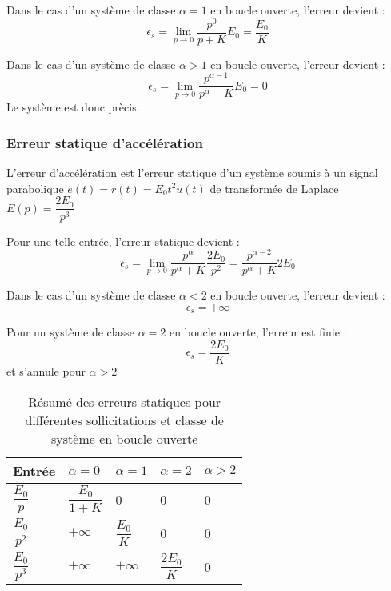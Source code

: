 Dans le cas d'un système de classe $\alpha=1$ en boucle ouverte, 
l'erreur devient :
$$
\epsilon_s=\lim\limits_{p\to 0}\dfrac{p^0}{p+K}E_0=\dfrac{E_0}{K}
$$

Dans le cas d'un système de classe $\alpha>1$ en boucle ouverte, 
l'erreur devient :
$$
\epsilon_s=\lim\limits_{p\to 0}\dfrac{p^{\alpha-1}}{p^\alpha+K}E_0=0
$$
Le système est donc prècis.

\subsubsection{Erreur statique d'accélération}

L'erreur d'accélération est l'erreur statique d'un système soumis à un signal
parabolique $e(t)=r(t)=E_0t^2 u(t)$ de transformée de Laplace 
$E(p)=\dfrac{2E_0}{p^3}$

Pour une telle entrée, l'erreur statique devient :
$$
\epsilon_s=\lim\limits_{p\to 0} \dfrac{p^\alpha}{p^\alpha+K}\dfrac{2E_0}{p^2}
          =\dfrac{p^{\alpha-2}}{p^\alpha+K}2E_0 
$$

Dans le cas d'un système de classe $\alpha<2$ en boucle ouverte, 
l'erreur devient :
$$
\epsilon_s=+\infty
$$

Pour un système de classe $\alpha=2$ en boucle ouverte, 
l'erreur est finie :
$$
\epsilon_s=\dfrac{2E_0}{K}
$$
et s'annule pour $\alpha>2$

\begin{table}
    \centering
    \begin{tabular}{@{}P{2cm}P{2cm}P{2cm}P{2cm}P{2cm}@{}}
    \toprule
    Entrée & $\alpha=0$ & $\alpha=1$ & $\alpha=2$ & $\alpha>2$ \\
    \midrule
    $\dfrac{E_0}{p}$&$\dfrac{E_0}{1+K}$&0&0&0\\
    $\dfrac{E_0}{p^2}$&$+\infty$&$\dfrac{E_0}{K}$&0&0\\
    $\dfrac{E_0}{p^3}$&$+\infty$&$+\infty$&$\dfrac{2E_0}{K}$&0\\
    \bottomrule
    \end{tabular}
\caption{Résumé des erreurs statiques pour différentes 
         sollicitations et classe de système en boucle ouverte}
\end{table}

